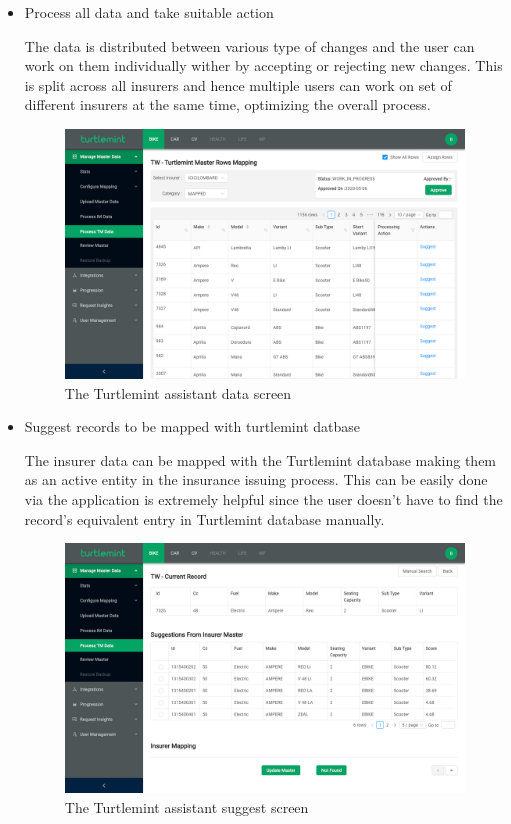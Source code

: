 \begin{itemize}
    \item Process all data and take suitable action

    The data is distributed between various type of changes and the user can
    work on them individually wither by accepting or rejecting new changes.
    This is split across all insurers and hence multiple users can work on
    set of different insurers at the same time, optimizing the overall process.
    \begin{figure}
        \includegraphics[width=\textwidth]{ch5/tap_data_work.png}
        \caption{The Turtlemint assistant data screen}
    \end{figure}

    \item Suggest records to be mapped with turtlemint datbase

    The insurer data can be mapped with the Turtlemint database making them
    as an active entity in the insurance issuing process. This can be easily
    done via the application is extremely helpful since the user doesn't have
    to find the record's equivalent entry in Turtlemint database manually.
    \begin{figure}
        \includegraphics[width=\textwidth]{ch5/tap_suggest.png}
        \caption{The Turtlemint assistant suggest screen}
    \end{figure}
\end{itemize}

